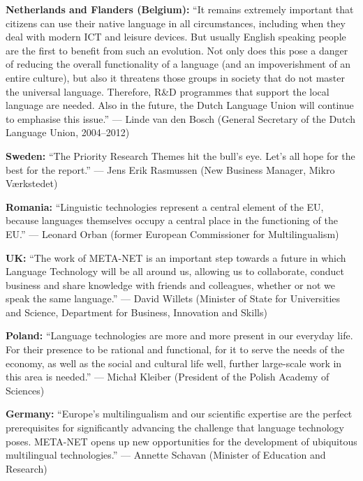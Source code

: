 \documentclass[10pt, plain]{../../metanetpaper}
\begin{document}
\medskip \textbf{Netherlands and Flanders (Belgium):} ``It remains extremely important that citizens can use their native language in all circumstances, including when they deal with modern ICT and leisure devices.  But usually English speaking people are the first to benefit from such an evolution.  Not only does this pose a danger of reducing the overall functionality of a language (and an impoverishment of an entire culture), but also it threatens those groups in society that do not master the universal language. Therefore, R\&D programmes that support the local language are needed. Also in the future, the Dutch Language Union will continue to emphasise this issue.'' --- Linde van den Bosch (General Secretary of the Dutch Language Union, 2004--2012)

\medskip \textbf{Sweden:} ``The Priority Research Themes hit the bull's eye. Let's all hope for the best for the report.'' --- Jens Erik Rasmussen (New Business Manager, Mikro Værkstedet)

\medskip \textbf{Romania:} ``Linguistic technologies represent a central element of the EU, because languages themselves occupy a central place in the functioning of the EU.'' --- Leonard Orban (former European Commissioner for Multilingualism)

\medskip \textbf{UK:} ``The work of META-NET is an important step towards a future in which Language Technology will be all around us, allowing us to collaborate, conduct business and share knowledge with friends and colleagues, whether or not we speak the same language.'' --- David Willets (Minister of State for Universities and Science, Department for Business, Innovation and Skills)

\medskip \textbf{Poland:} ``Language technologies are more and more present in our everyday life. For their presence to be rational and functional, for it to serve the needs of the economy, as well as the social and cultural life well, further large-scale work in this area is needed.'' --- Michał Kleiber (President of the Polish Academy of Sciences)

\medskip \textbf{Germany:} ``Europe's multilingualism and our scientific expertise are the perfect prerequisites for significantly advancing the challenge that language technology poses. META-NET opens up new opportunities for the development of ubiquitous multilingual technologies.'' --- Annette Schavan (Minister of Education and Research)

\end{document}
